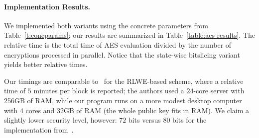 \documentclass[11pt]{llncs}
\newcommand*\swbs{state-wise bitslicing\xspace}
\begin{document}
\paragraph{Implementation Results.} We implemented both variants
using the concrete parameters from Table~\ref{t:concparams}; our
results are summarized in 
Table~\ref{table:aes-results}. The 
relative time is the total time of AES evaluation divided  by the
number of encryptions processed in parallel. Notice that the \swbs variant
yields  better relative times. 

Our timings are comparable to~\cite{GHS2012c} for the RLWE-based scheme, where a relative time of $5$ minutes per block is
reported; the authors used a $24$-core server with 256GB of RAM, while
our program runs on a more modest desktop computer with 4 cores and
32GB of RAM (the whole public key fits in RAM).
We claim a slightly lower security level, however: $72$ bits versus $80$
bits for the implementation from~\cite{GHS2012c}.

%


\end{document}
